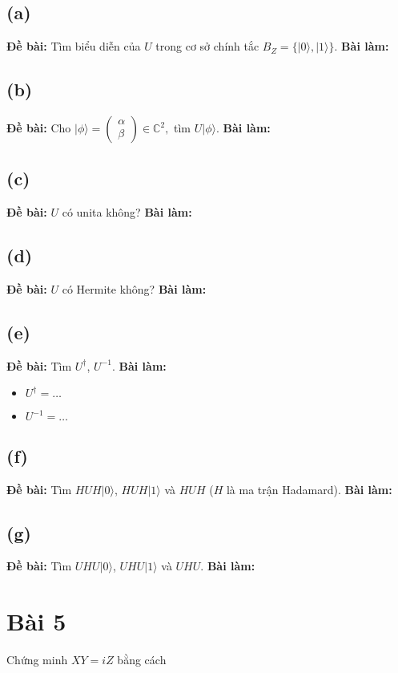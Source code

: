 \subsection{(a)}
\textbf{Đề bài:} Tìm biểu diễn của $U$ trong cơ sở chính tắc $B_{Z}=\{|0\rangle,|1\rangle\}$.
\textbf{Bài làm:}

\subsection{(b)}
\textbf{Đề bài:} Cho $|\phi\rangle=\begin{pmatrix}\alpha\\ \beta\end{pmatrix}\in\mathbb{C}^{2},$ tìm $U|\phi\rangle$.
\textbf{Bài làm:}

\subsection{(c)}
\textbf{Đề bài:} $U$ có unita không?
\textbf{Bài làm:}

\subsection{(d)}
\textbf{Đề bài:} $U$ có Hermite không?
\textbf{Bài làm:}

\subsection{(e)}
\textbf{Đề bài:} Tìm $U^{\dagger}$, $U^{-1}$.
\textbf{Bài làm:}
\begin{itemize}
    \item $U^{\dagger} = \dots$
    \item $U^{-1} = \dots$
\end{itemize}

\subsection{(f)}
\textbf{Đề bài:} Tìm $HUH|0\rangle$, $HUH|1\rangle$ và $HUH$ ($H$ là ma trận Hadamard).
\textbf{Bài làm:}

\subsection{(g)}
\textbf{Đề bài:} Tìm $UHU|0\rangle$, $UHU|1\rangle$ và $UHU$.
\textbf{Bài làm:}

\section{Bài 5}
Chứng minh $XY=iZ$ bằng cách

